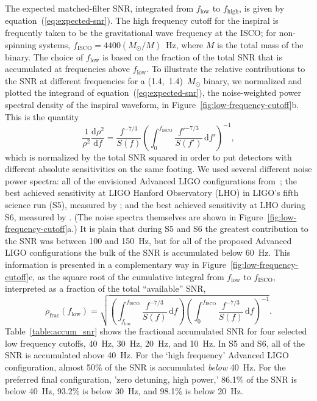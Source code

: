\documentclass[preprint2]{aastex}
\newcommand{\Msun}{\ensuremath{M_{\odot}}}
\begin{document}
The expected matched-filter SNR, integrated from $f_\mathrm{low}$ to $f_\mathrm{high}$, is given by equation~(\ref{eq:expected-snr}).  The high frequency cutoff for the inspiral is frequently taken to be the gravitational wave frequency at the ISCO; for non-spinning systems, $f_\mathrm{ISCO} = 4400 (\Msun / M)$~Hz, where $M$ is the total mass of the binary.  The choice of $f_\mathrm{low}$ is based on the fraction of the total SNR that is accumulated at frequencies above $f_\mathrm{low}$.  To illustrate the relative contributions to the SNR at different frequencies for a (1.4,~1.4)~$\Msun$ binary, we normalized and plotted the integrand of equation~(\ref{eq:expected-snr}), the noise-weighted power spectral density of the inspiral waveform, in Figure~\ref{fig:low-frequency-cutoff}b.  This is the quantity
%
$$
	\frac{1}{\rho^2}\frac{\mathrm{d}\rho^2}{\mathrm{d}f} = \frac{f^{-7/3}}{S(f)} \left( \int_0^{f_\mathrm{ISCO}} \frac{{f'}^{-7/3}}{S(f')} \, \mathrm{d}f' \right)^{-1},
$$
%
which is normalized by the total SNR squared in order to put detectors with different absolute sensitivities on the same footing.  We used several different noise power spectra: all of the envisioned Advanced LIGO configurations from~\citet{ALIGONoise}; the best achieved sensitivity at LIGO Hanford Observatory (LHO) in LIGO's fifth science run (S5), measured by \citet{S5InspiralRange}; and the best achieved sensitivity at LHO during S6, measured by \citet{S6InspiralRange}.  (The noise spectra themselves are shown in Figure~\ref{fig:low-frequency-cutoff}a.)  It is plain that during S5 and S6 the greatest contribution to the SNR was between 100 and 150~Hz, but for all of the proposed Advanced LIGO configurations the bulk of the SNR is accumulated below 60~Hz.  This information is presented in a complementary way in Figure~\ref{fig:low-frequency-cutoff}c, as the square root of the cumulative integral from $f_\mathrm{low}$ to $f_\mathrm{ISCO}$, interpreted as a fraction of the total ``available'' SNR,
%
$$
	\rho_\mathrm{frac}(f_\mathrm{low}) = \sqrt{\left( \int_{f_\mathrm{low}}^{f_\mathrm{ISCO}} \frac{{f}^{-7/3}}{S(f)} \, \mathrm{d}f \right) \left( \int_0^{f_\mathrm{ISCO}} \frac{{f}^{-7/3}}{S(f)} \, \mathrm{d}f \right)^{-1}}.
$$
%
Table~\ref{table:accum_snr} shows the fractional accumulated SNR for four selected low frequency cutoffs, 40~Hz, 30~Hz, 20~Hz, and 10~Hz.  In S5 and S6, all of the SNR is accumulated above 40~Hz.  For the `high frequency' Advanced LIGO configuration, almost 50\% of the SNR is accumulated \emph{below} 40~Hz.  For the preferred final configuration, 'zero detuning, high power,' 86.1\% of the SNR is below 40~Hz, 93.2\% is below 30~Hz, and 98.1\% is below 20~Hz.
\end{document}
